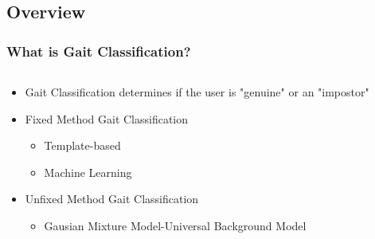 \documentclass{beamer}
\begin{document}
\subsection{Overview}
\begin{frame}
\frametitle{What is Gait Classification?}
 \begin{columns}
  \begin{column}{.9\textwidth}
  \begin{itemize}
  		\item Gait Classification determines if the user is "genuine" or an "impostor"
  		\linebreak
		\item Fixed Method Gait Classification
			\begin{itemize}
				\item Template-based 
				\item Machine Learning 
				\linebreak
			\end{itemize}
			
		\item Unfixed Method Gait Classification
			\begin{itemize}
				\item Gausian Mixture Model-Universal Background Model
			\end{itemize}
  \end{itemize}
  \end{column}
  \begin{column}{0.7\textwidth}
       \\
  \end{column}
  \end{columns}  
\end{frame}
\end{document}
